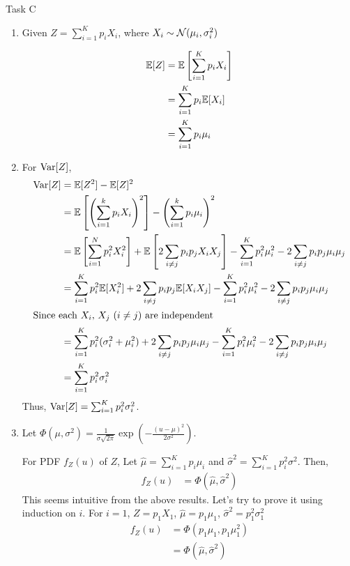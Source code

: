 \begin{task}{Task C}
	\begin{enumerate}
		\item Given $Z=\sum_{i=1}^Kp_iX_i$, where $X_i\sim\mathcal{N}(\mu_i,\sigma_i^2)$

		      \begin{align}
			      \mathbb{E}[Z] & = \mathbb{E}\left[\sum_{i=1}^Kp_iX_i\right] \\
			            & = \sum_{i=1}^Kp_i\mathbb{E}[X_i]            \\
			            & = \sum_{i=1}^Kp_i\mu_i
		      \end{align}

		\item       For $\text{Var}[Z]$,
		      \begin{align}
			      \text{Var}[Z] & = \mathbb{E}[Z^2] - \mathbb{E}[Z]^2                                                                                                                                \\
			              & = \mathbb{E}\left[ \left(\sum_{i=1}^k p_i X_i\right)^2\right] - \left(\sum_{i=1}^k p_i\mu_i\right)^2                                                       \\
			              & = \mathbb{E}\left[\sum_{i=1}^N p_i^2X_i^2\right] + \mathbb{E}\left[2\sum_{i\neq j}p_ip_jX_iX_j\right] - \sum_{i=1}^Kp_i^2\mu_i^2 - 2\sum_{i\neq j}p_ip_j\mu_i\mu_j \\
			              & = \sum_{i=1}^K p_i^2\mathbb{E}[X_i^2] + 2\sum_{i\neq j} p_ip_j \mathbb{E}[X_iX_j] - \sum_{i=1}^Kp_i^2\mu_i^2 - 2\sum_{i\neq j}p_ip_j\mu_i\mu_j                     \\
			      \intertext{Since each $X_i$, $X_j$ ($i\neq j$) are independent}
			              & = \sum_{i=1}^K p_i^2(\sigma_i^2 + \mu_i^2) + 2\sum_{i\neq j} p_ip_j \mu_i\mu_j - \sum_{i=1}^Kp_i^2\mu_i^2 - 2\sum_{i\neq j}p_ip_j\mu_i\mu_j        \\
			              & = \sum_{i=1}^K p_i^2\sigma_i^2
		      \end{align}
		      Thus, $\text{Var}[Z] = \sum_{i=1}^K p_i^2\sigma_i^2$.


		\item Let $\Phi(\mu, \sigma^2) = \frac{1}{\sigma\sqrt{2\pi}}\exp\left(-\frac{(u-\mu)^2}{2\sigma^2}\right) $.

		      For PDF $f_Z(u)$ of $Z$, Let $\hat{\mu} = \sum_{i=1}^K p_i\mu_i$ and
		      $\hat{\sigma}^2 = \sum_{i=1}^K p_i^2\sigma^2$. Then,
		      \begin{align}
			      f_Z(u) & = \Phi(\hat{\mu}, \hat{\sigma}^2)
		      \end{align}
		      This seems intuitive from the above results. Let's try to prove it using induction on $i$. For $i=1$, $Z = p_1X_1$, $\hat{\mu} = p_1\mu_1$, $\hat{\sigma}^2 = p_1^2\sigma_1^2$
		      \begin{align}
			      f_Z(u) & = \Phi (p_1\mu_1, p_1\mu_1^2)      \\
			             & = \Phi (\hat{\mu}, \hat{\sigma}^2)
		      \end{align}


\end{enumerate}
\end{task}
